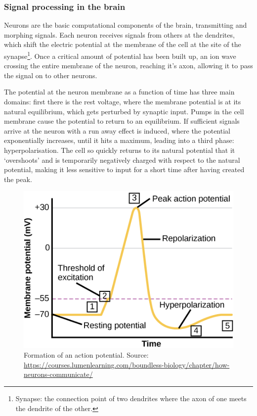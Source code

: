 \documentclass[10pt,a4paper]{article}
\begin{document}
\subsubsection{Signal processing in the brain}
Neurons are the basic computational components of the brain, transmitting and
morphing signals. Each neuron receives signals from others at the dendrites,
which shift the electric potential at the membrane of the cell at the site of
the synapse\footnote{Synapse: the connection point of two dendrites where the
axon of one meets the dendrite of the other.}. Once a critical amount of
potential has been built up, an ion wave crossing the entire membrane of the
neuron, reaching it's axon, allowing it to pass the signal on to other neurons.

The potential at the neuron membrane as a function of time has three main
domains: first there is the rest voltage, where the membrane potential is at its
natural equilibrium, which gets perturbed by synaptic input. Pumps in the cell
membrane cause the potential to return to an equilibrium. If sufficient signals
arrive at the neuron with a run away effect is induced, where the potential
exponentially increases, until it hits a maximum, leading into a third phase:
hyperpolarisation. The cell so quickly returns to its natural potential that it
`overshoots' and is temporarily negatively charged with respect to the natural
potential, making it less sensitive to input for a short time after having
created the peak.

\begin{figure}[ht]
    \centering
    \includegraphics[width=\textwidth]{figures/action-potential.png}
    \caption{Formation of an action potential. Source:  \url{https://courses.lumenlearning.com/boundless-biology/chapter/how-neurons-communicate/}}
    \label{fig:action-potential}
\end{figure}
\end{document}
